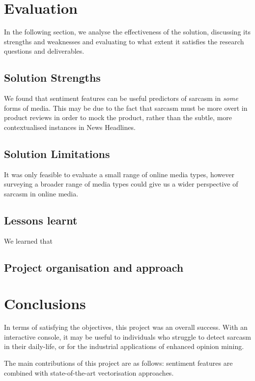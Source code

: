 \documentclass[12pt,a4paper]{article}
\begin{document}
\section{Evaluation}
In the following section, we analyse the effectiveness of the solution, discussing its strengths and weaknesses and evaluating to what extent it satisfies the research questions and deliverables.

\subsection{Solution Strengths}
We found that sentiment features can be useful predictors of sarcasm in \textit{some} forms of media. This may be due to the fact that sarcasm must be more overt in product reviews in order to mock the product, rather than the subtle, more contextualised instances in News Headlines.



\subsection{Solution Limitations}
It was only feasible to evaluate a small range of online media types, however surveying a broader range of media types could give us a wider perspective of sarcasm in online media.


\subsection{Lessons learnt}
We learned that 


\subsection{Project organisation and approach}





\section{Conclusions}
In terms of satisfying the objectives, this project was an overall success. With an interactive console, it may be useful to individuals who struggle to detect sarcasm in their daily-life, or for the industrial applications of enhanced opinion mining.

The main contributions of this project are as follows: sentiment features are combined with state-of-the-art vectorisation approaches. 
\end{document}
